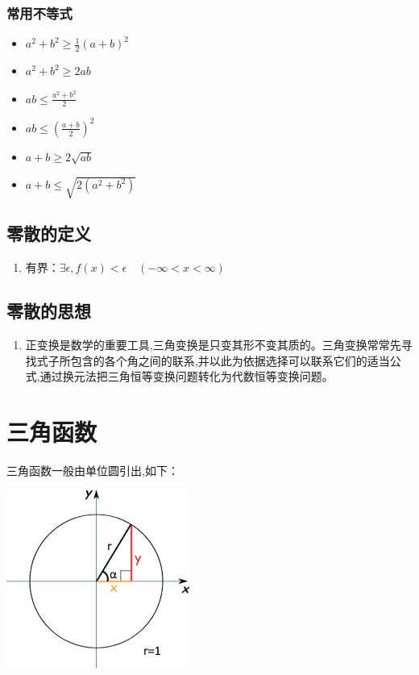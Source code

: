 \documentclass[UTF8]{ctexbook}
\begin{document}
{{{\subsubsection{常用不等式}{
  \begin{itemize}
    \item $a^2 + b^2 \geq \frac{1}{2}(a + b)^2$
    \item $a^2 + b^2 \geq 2ab$
    \item $ab \leq \frac{a^2 + b^2}{2}$
    \item $ab \leq (\frac{a + b}{2})^2$
    \item $a + b \geq 2\sqrt{ab}$
    \item $a + b \leq \sqrt{2(a^2 + b^2)}$
  \end{itemize}
}%

}%

\subsection{零散的定义}{
  \begin{enumerate}
    \item 有界：$\exists\epsilon,f(x) < \epsilon\quad(-\infty < x < \infty )$
  \end{enumerate}
}%

\subsection{零散的思想}{
  \begin{enumerate}
    \item 正变换是数学的重要工具,三角变换是只变其形不变其质的。三角变换常常先寻找式子所包含的各个角之间的联系,并以此为依据选择可以联系它们的适当公式,通过换元法把三角恒等变换问题转化为代数恒等变换问题。
  \end{enumerate}
}%

}%

\section{三角函数}{
三角函数一般由单位圆引出,如下：

\includegraphics{resources/UnitCircle.png}

}}
\end{document}

